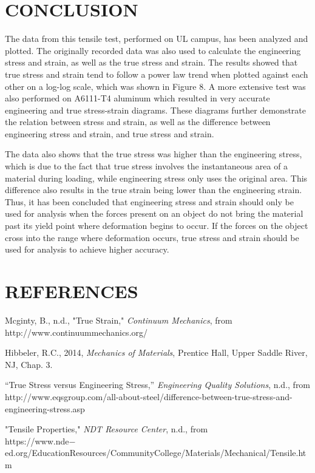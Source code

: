 \documentclass[12pt]{article}
\begin{document}
\section*{\fontsize{12}{12}\selectfont CONCLUSION}
The data from this tensile test, performed on UL campus, has been analyzed and plotted. The originally recorded data was also used to calculate the engineering stress and strain, as well as the true stress and strain. The results showed that true stress and strain tend to follow a power law trend when plotted against each other on a log-log scale, which was shown in Figure 8. A more extensive test was also performed on A6111-T4 aluminum which resulted in very accurate engineering and true stress-strain diagrams. These diagrams further demonstrate the relation between stress and strain, as well as the difference between engineering stress and strain, and true stress and strain.
\bigskip

The data also shows that the true stress was higher than the engineering stress, which is due to the fact that true stress involves the instantaneous area of a material during loading, while engineering stress only uses the original area. This difference also results in the true strain being lower than the engineering strain. Thus, it has been concluded that engineering stress and strain should only be used for analysis when the forces present on an object do not bring the material past its yield point where deformation begins to occur. If the forces on the object cross into the range where deformation occurs, true stress and strain should be used for analysis to achieve higher accuracy.
\bigskip


\section*{\fontsize{12}{12}\selectfont REFERENCES}

\begin{thebibliography}{2}

Mcginty, B., n.d.,
"True Strain," \emph{Continuum Mechanics}, from
http://www.continuummechanics.org/

\bibitem{}
Hibbeler, R.C., 2014, \emph{Mechanics of Materials}, Prentice Hall, Upper Saddle River, NJ, Chap. 3.

\bibitem{}
“True Stress versus Engineering Stress,” \emph{Engineering Quality Solutions}, n.d., from
http://www.eqsgroup.com/all-about-steel/difference-between-true-stress-and-engineering-stress.asp

\bibitem{}
"Tensile Properties," \emph{NDT Resource Center}, n.d., from
\\https://www.nde$-$ed.org/EducationResources/CommunityCollege/Materials/Mechanical/Tensile.htm

\end{thebibliography}


\end{document}
